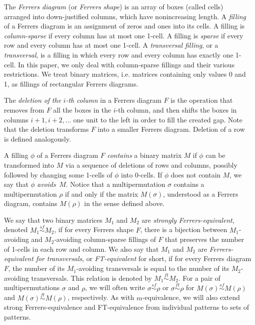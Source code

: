\documentclass[11pt]{amsart}
\theoremstyle{plain}
\theoremstyle{definition}
\newcommand{\sfsim}{\stackrel{sf}{\sim}}
\newcommand{\ftsim}{\stackrel{ft}{\sim}}
\begin{document}
The \emph{Ferrers diagram} (or \emph{Ferrers shape}) is an array of boxes (called cells) arranged
into down-justified columns, which have nonincreasing length. A \emph{filling} of a Ferrers diagram
is an assignment of zeros and ones into its cells. A filling is \emph{column-sparse} if every column
has at most one 1-cell. A filling is \emph{sparse} if every row and every column has at most one
1-cell. A \emph{transversal filling}, or a \emph{transversal}, is a filling in which every row and
every column has exactly one 1-cell. In this paper, we only deal with column-sparse fillings and
their various restrictions. We treat binary matrices, i.e. matrices containing only values 0 and 1,
as fillings of rectangular Ferrers diagrams.

The \emph{deletion of the $i$-th column} in a Ferrers diagram $F$ is the operation that removes from
$F$ all the boxes in the $i$-th column, and then shifts the boxes in columns $i+1, i+2,\dotsc$ one
unit to the left in order to fill the created gap. Note that the deletion transforms $F$ into a
smaller Ferrers diagram. Deletion of a row is defined analogously.

A filling $\phi$ of a Ferrers diagram $F$ \emph{contains} a binary matrix $M$ if $\phi$ can be
transformed into $M$ via a sequence of deletions of rows and columns, possibly followed by changing
some 1-cells of $\phi$ into 0-cells. If $\phi$ does not contain $M$, we say that $\phi$
\emph{avoids}~$M$. Notice that a
multipermutation $\sigma$ contains a multipermutation $\rho$ if and only if the matrix
$M(\sigma)$, understood as a Ferrers diagram, contains $M(\rho)$ in the sense defined above.

We say that two binary matrices $M_1$ and $M_2$ are \emph{strongly Ferrers-equivalent}, denoted
$M_1\sfsim M_2$, if for every Ferrers shape $F$, there is a bijection between $M_1$-avoiding and
$M_2$-avoiding column-sparse fillings of $F$ that preserves the number of 1-cells in each row and
column. We also say that $M_1$ and $M_2$ are \emph{Ferrers-equivalent for transversals}, or
\emph{FT-equivalent} for short, if for every Ferrers diagram $F$, the number of its $M_1$-avoiding
transversals is equal to the number of its $M_2$-avoiding transversals. This relation is denoted by
$M_1\ftsim M_2$.  For a pair of multipermutations $\sigma$ and $\rho$, we
will often write $\sigma\sfsim \rho$ or $\sigma\ftsim\rho$ for $M(\sigma)\sfsim M(\rho)$ and
$M(\sigma)\ftsim M(\rho)$, respectively. As with $m$-equivalence, we will also extend strong
Ferrers-equivalence and FT-equivalence from individual patterns to sets of patterns.
\end{document}
